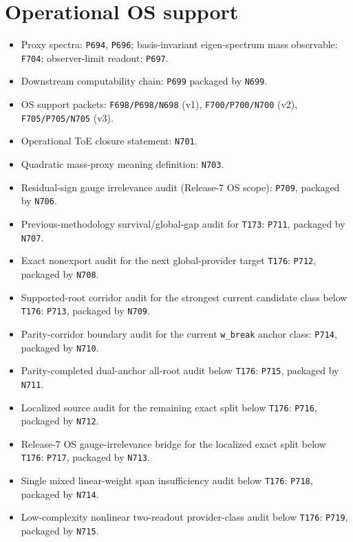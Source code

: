 \documentclass[11pt,a4paper]{article}
\begin{document}
\section{Operational OS support}

\begin{itemize}
  \item Proxy spectra: \texttt{P694}, \texttt{P696}; basis-invariant eigen-spectrum mass observable: \texttt{F704}; observer-limit readout: \texttt{P697}.
  \item Downstream computability chain: \texttt{P699} packaged by \texttt{N699}.
  \item OS support packets: \texttt{F698/P698/N698} (v1), \texttt{F700/P700/N700} (v2), \texttt{F705/P705/N705} (v3).
  \item Operational ToE closure statement: \texttt{N701}.
  \item Quadratic mass-proxy meaning definition: \texttt{N703}.
  \item Residual-sign gauge irrelevance audit (Release-7 OS scope): \texttt{P709}, packaged by \texttt{N706}.
  \item Previous-methodology survival/global-gap audit for \texttt{T173}: \texttt{P711}, packaged by \texttt{N707}.
  \item Exact nonexport audit for the next global-provider target \texttt{T176}: \texttt{P712}, packaged by \texttt{N708}.
  \item Supported-root corridor audit for the strongest current candidate class below \texttt{T176}: \texttt{P713}, packaged by \texttt{N709}.
  \item Parity-corridor boundary audit for the current \texttt{w\_break} anchor class: \texttt{P714}, packaged by \texttt{N710}.
  \item Parity-completed dual-anchor all-root audit below \texttt{T176}: \texttt{P715}, packaged by \texttt{N711}.
  \item Localized source audit for the remaining exact split below \texttt{T176}: \texttt{P716}, packaged by \texttt{N712}.
  \item Release-7 OS gauge-irrelevance bridge for the localized exact split below \texttt{T176}: \texttt{P717}, packaged by \texttt{N713}.
  \item Single mixed linear-weight span insufficiency audit below \texttt{T176}: \texttt{P718}, packaged by \texttt{N714}.
  \item Low-complexity nonlinear two-readout provider-class audit below \texttt{T176}: \texttt{P719}, packaged by \texttt{N715}.

\end{itemize}
\end{document}
